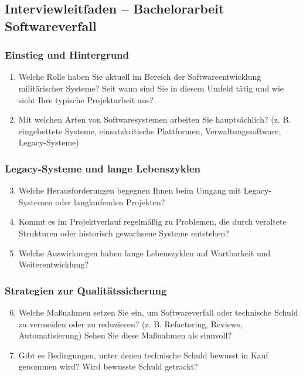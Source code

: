 \subsection*{Interviewleitfaden – Bachelorarbeit Softwareverfall}

\subsubsection*{Einstieg und Hintergrund}
\begin{enumerate}
    \item Welche Rolle haben Sie aktuell im Bereich der Softwareentwicklung militärischer Systeme? Seit wann sind Sie in diesem Umfeld tätig und wie sieht Ihre typische Projektarbeit aus?
    \item Mit welchen Arten von Softwaresystemen arbeiten Sie hauptsächlich? (z. B. eingebettete Systeme, einsatzkritische Plattformen, Verwaltungssoftware, Legacy-Systeme)
\end{enumerate}

\subsubsection*{Legacy-Systeme und lange Lebenszyklen}
\begin{enumerate}
    \setcounter{enumi}{2}
    \item Welche Herausforderungen begegnen Ihnen beim Umgang mit Legacy-Systemen oder langlaufenden Projekten?
    \item Kommt es im Projektverlauf regelmäßig zu Problemen, die durch veraltete Strukturen oder historisch gewachsene Systeme entstehen?
    \item Welche Auswirkungen haben lange Lebenszyklen auf Wartbarkeit und Weiterentwicklung?
\end{enumerate}

\subsubsection*{Strategien zur Qualitätssicherung}
\begin{enumerate}
    \setcounter{enumi}{5}
    \item Welche Maßnahmen setzen Sie ein, um Softwareverfall oder technische Schuld zu vermeiden oder zu reduzieren? (z. B. Refactoring, Reviews, Automatisierung) Sehen Sie diese Maßnahmen als sinnvoll?
    \item Gibt es Bedingungen, unter denen technische Schuld bewusst in Kauf genommen wird? Wird bewusste Schuld getrackt?
\end{enumerate}

